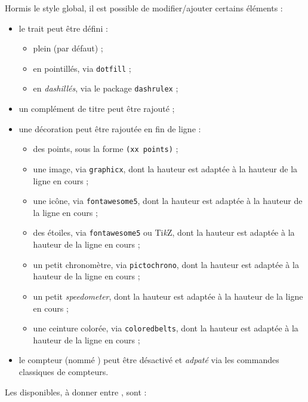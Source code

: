 \documentclass[french,11pt,a4paper]{article}
\providecommand\tikzlogo{Ti\textit{k}Z}
\let\TikZ\tikzlogo
\begin{document}
Hormis le style global, il est possible de modifier/ajouter certains éléments :

\begin{itemize}
	\item le trait peut être défini :
	\begin{itemize}
		\item plein (par défaut) ;
		\item en pointillés, via \texttt{dotfill} ;
		\item en \textit{dashillés}, via le package \texttt{dashrulex} ;
	\end{itemize}
	\item un complément de titre peut être rajouté ;
	\item une décoration peut être rajoutée en fin de ligne :
	\begin{itemize}
		\item des points, sous la forme \texttt{(xx points)} ;
		\item une image, via \texttt{graphicx}, dont la hauteur est adaptée à la hauteur de la ligne en cours ;
		\item une icône, via \texttt{fontawesome5}, dont la hauteur est adaptée à la hauteur de la ligne en cours ;
		\item des étoiles, via \texttt{fontawesome5} ou \TikZ, dont la hauteur est adaptée à la hauteur de la ligne en cours ;
		\item un petit chronomètre, via \texttt{pictochrono}, dont la hauteur est adaptée à la hauteur de la ligne en cours ;
		\item un petit \textit{speedometer}, dont la hauteur est adaptée à la hauteur de la ligne en cours ;
		\item une ceinture colorée, via \texttt{coloredbelts}, dont la hauteur est adaptée à la hauteur de la ligne en cours ;
	\end{itemize}
	\item le compteur (nommé ) peut être désactivé et \textit{adpaté} via les commandes classiques de compteurs.
\end{itemize}

Les  disponibles, à donner entre \MontreCode{[...]}, sont :
\end{document}
